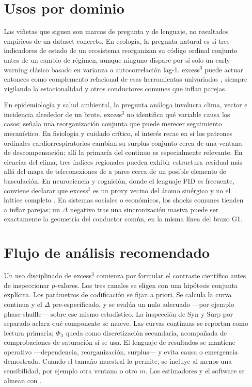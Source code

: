 \documentclass[11pt,a4paper]{article}
\begin{document}
\section{Usos por dominio}
\label{sec:dominios}

Las vi\~netas que siguen son marcos de pregunta y de lenguaje, no resultados
emp\'iricos de un dataset concreto. En ecolog\'ia, la pregunta natural es si
tres indicadores de estado de un ecosistema reorganizan su c\'odigo ordinal
conjunto antes de un cambio de r\'egimen, aunque ninguno dispare por s\'i
solo un early-warning cl\'asico basado en varianza o autocorrelaci\'on
lag-1. excess$^3$ puede actuar entonces como complemento relacional de esas
herramientas univariadas \citep{Scheffer2009}, siempre vigilando la
estacionalidad y otros conductores comunes que inflan parejas.

En epidemiolog\'ia y salud ambiental, la pregunta an\'aloga involucra clima,
vector e incidencia alrededor de un brote. excess$^3$ no identifica qu\'e
variable causa los casos; se\~nala una reorganizaci\'on conjunta que puede
merecer seguimiento mecan\'istico. En fisiolog\'ia y cuidado cr\'itico, el
inter\'es recae en si los patrones ordinales cardiorrespiratorios cambian su
surplus conjunto cerca de una ventana de descompensaci\'on; all\'i la
primac\'ia del continuo es especialmente relevante. En ciencias del clima,
tres \'indices regionales pueden exhibir estructura residual m\'as all\'a del
mapa de teleconexiones de a pares cerca de un posible elemento de
basculaci\'on. En neurociencia y cognici\'on, donde el lenguaje PID es
frecuente, conviene declarar que excess$^3$ es un proxy vecino del \'atomo
sin\'ergico y no el lattice completo \citep{Williams2010,Rosas2019}. En
sistemas sociales o econ\'omicos, los shocks comunes tienden a inflar
parejas; un $\Delta$ negativo tras una sincronizaci\'on masiva puede ser
exactamente la geometr\'ia del conductor com\'un, en la misma l\'inea del
brazo G1.

\section{Flujo de an\'alisis recomendado}
\label{sec:flujo}

Un uso disciplinado de excess$^3$ comienza por formular el contraste
cient\'ifico antes de inspeccionar $p$-valores. Los tres canales se eligen
con una hip\'otesis conjunta expl\'icita. Los par\'ametros de codificaci\'on se
fijan a priori. Se calcula la curva continua y el $\Delta$ pre-especificado,
y se eval\'ua un nulo adecuado ---por ejemplo phase-shuffle--- sobre ese
mismo estad\'istico. La inspecci\'on de Syn y Surp por separado aclara qu\'e
componente se mueve. Las curvas continuas se reportan como lectura
primaria; $\Phi_3$ queda como discretizaci\'on secundaria, acompa\~nada de
comprobaciones de saturaci\'on si se usa. El lenguaje de resultados se
mantiene operativo ---dependencia, reorganizaci\'on, surplus--- y evita
causa o emergencia demostrada. Cuando el tama\~no muestral lo permite, se
incluye al menos una sensibilidad, por ejemplo otra ventana o otro $m$.
Los estimadores y el software se alinean con
\citep{Padilla2026excess3}.
\end{document}
